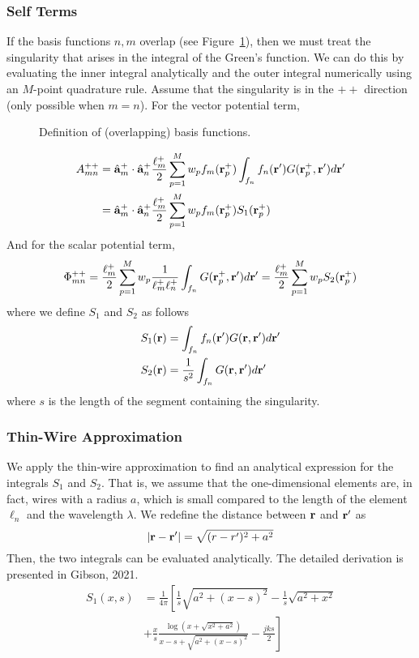 \subsubsection{Self Terms}
If the basis functions $n, m$ overlap (see Figure~\ref{fig:mom_basis3}), then we must treat the singularity that arises in the integral of the Green's function. We can do this by evaluating the inner integral analytically and the outer integral numerically using an $M$-point quadrature rule. Assume that the singularity is in the $++$ direction (only possible when $m = n$). For the vector potential term,
\begin{figure}[t]
	\centering
	
	\caption{Definition of (overlapping) basis functions.}
	\label{fig:mom_basis3}
\end{figure}
\begin{align*}
	A_{mn}^{++} & = \hat{\mathbf{a}}_m^{+} \cdot \hat{\mathbf{a}}_n^{+} \frac{\ell_m^+}{2} \sum_{p = 1}^M w_p f_m(\mathbf{r}_p^+) \int_{f_n} f_n(\mathbf{r}^\prime) G(\mathbf{r}_p^+, \mathbf{r}^\prime) d\mathbf{r}^\prime \\
	& = \hat{\mathbf{a}}_m^{+} \cdot \hat{\mathbf{a}}_n^{+} \frac{\ell_m^+}{2} \sum_{p = 1}^M w_p f_m(\mathbf{r}_p^+) S_1(\mathbf{r}_p^+)
\end{align*}
And for the scalar potential term,
\begin{equation*}
	\Phi_{mn}^{++} = \frac{\ell_m^+}{2} \sum_{p = 1}^M w_p \frac{1}{\ell_m^+ \ell_n^+} \int_{f_n} G(\mathbf{r}_p^+, \mathbf{r}^\prime) d\mathbf{r}^\prime = \frac{\ell_m^+}{2} \sum_{p = 1}^M w_p S_2(\mathbf{r}_p^+)
\end{equation*}
where we define $S_1$ and $S_2$ as follows
\begin{align}
	S_1(\mathbf{r}) & = \int_{f_n} f_n(\mathbf{r}^\prime) G(\mathbf{r}, \mathbf{r}^\prime) d\mathbf{r}^\prime \\
	S_2(\mathbf{r}) & = \frac{1}{s^2} \int_{f_n} G(\mathbf{r}, \mathbf{r}^\prime) d\mathbf{r}^\prime
\end{align}
where $s$ is the length of the segment containing the singularity. 

\subsubsection{Thin-Wire Approximation}
We apply the thin-wire approximation to find an analytical expression for the integrals $S_1$ and $S_2$. That is, we assume that the one-dimensional elements are, in fact, wires with a radius $a$, which is small compared to the length of the element $\ell_n$ and the wavelength $\lambda$. We redefine the distance between $\mathbf{r}$ and $\mathbf{r}^\prime$ as
\begin{equation*}
	|\mathbf{r} - \mathbf{r}^\prime| = \sqrt{(r - r^\prime)^2 + a^2}
\end{equation*}
Then, the two integrals can be evaluated analytically. The detailed derivation is presented in Gibson, 2021.
\begin{equation}
	\begin{aligned}
		S_1(x, s) & = \frac{1}{4\pi} \left[ \frac{1}{s} \sqrt{a^2 + (x - s)^2} - \frac{1}{s} \sqrt{a^2 + x^2} \right. \\
		 & + \left. \frac{x}{s} \frac{\log\left( x + \sqrt{x^2 + a^2} \right)}{x - s + \sqrt{a^2 + (x - s)^2}} - \frac{j k s}{2} \right]
	\end{aligned}
\end{equation}

